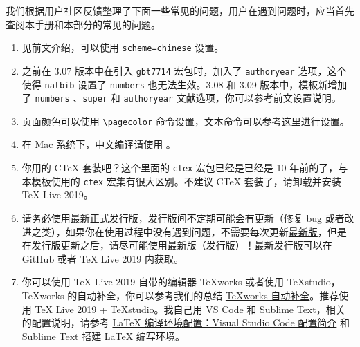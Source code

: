\documentclass[cn,11pt]{elegantbook}
\begin{document}
我们根据用户社区反馈整理了下面一些常见的问题，用户在遇到问题时，应当首先查阅本手册和本部分的常见的问题。

\begin{enumerate}[itemsep=1.5ex]
  \item {}
    见前文介绍，可以使用 \lstinline{scheme=chinese} 设置。
  \item {}
    之前在 3.07 版本中在引入 \lstinline{gbt7714} 宏包时，加入了 \lstinline{authoryear} 选项，这个使得 \lstinline{natbib} 设置了 \lstinline{numbers} 也无法生效。3.08 和 3.09 版本中，模板新增加了 \lstinline{numbers} 、\lstinline{super} 和 \lstinline{authoryear} 文献选项，你可以参考前文设置说明。
  \item {}
    页面颜色可以使用 \lstinline{\pagecolor} 命令设置，文本命令可以参考\href{https://tex.stackexchange.com/questions/278544/xcolor-what-is-the-equivalent-of-default-text-color}{这里}进行设置。
  \item {}
    在 Mac 系统下，中文编译请使用 。
  \item {}
    你用的 C\TeX{} 套装吧？这个里面的 \lstinline{ctex} 宏包已经是已经是 10 年前的了，与本模板使用的 \lstinline{ctex} 宏集有很大区别。不建议 C\TeX{} 套装了，请卸载并安装 \TeX{} Live 2019。
  \item {}
    请务必使用\href{https://github.com/ElegantLaTeX/ElegantBook/releases}{最新正式发行版}，发行版间不定期可能会有更新（修复 bug 或者改进之类），如果你在使用过程中没有遇到问题，不需要每次更新\href{https://github.com/ElegantLaTeX/ElegantBook/archive/master.zip}{最新版}，但是在发行版更新之后，请尽可能使用最新版（发行版）！最新发行版可以在 GitHub 或者 \TeX{} Live 2019 内获取。
  \item {}
    你可以使用 \TeX{} Live 2019 自带的编辑器 \TeX{}works 或者使用 \TeX{}studio，\TeX works 的自动补全，你可以参考我们的总结 \href{https://github.com/EthanDeng/texworks-autocomplete}{\TeX works 自动补全}。推荐使用 \TeX{} Live 2019 + \TeX{}studio。我自己用 VS Code 和 Sublime Text，相关的配置说明，请参考 \href{https://github.com/EthanDeng/vscode-latex}{\LaTeX{} 编译环境配置：Visual Studio Code 配置简介} 和 \href{https://github.com/EthanDeng/sublime-text-latex}{Sublime Text 搭建 \LaTeX{} 编写环境}。

\end{enumerate}
\end{document}
